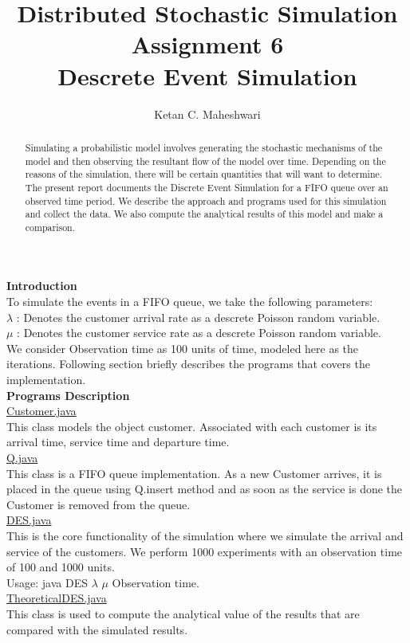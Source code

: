 \documentclass[a4paper,10pt]{report}
\title{Distributed Stochastic Simulation\\ Assignment 6\\ Descrete Event Simulation}
\author{Ketan C. Maheshwari}
\begin{document}
\maketitle

\begin{abstract}
Simulating a probabilistic model involves generating the stochastic mechanisms of the model and then observing the resultant flow of the model over time. Depending on the reasons of the simulation, there will be certain quantities that will want to determine. The present report documents the Discrete Event Simulation for a FIFO queue over an observed time period. We describe the approach and programs used for this simulation and collect the data. We also compute the analytical results of this model and make a comparison.
\end{abstract}

\noindent \textbf{Introduction}\\
To simulate the events in a FIFO queue, we take the following parameters:\\
$\lambda$ : Denotes the customer arrival rate as a descrete Poisson random variable.\\
$\mu$ : Denotes the customer service rate as a descrete Poisson random variable.\\
We consider Observation time as 100 units of time, modeled here as the iterations.
Following section briefly describes the programs that covers the implementation.\\

\noindent \textbf{Programs Description}\\
\underline{Customer.java}\\
This class models the object customer. Associated with each customer is its arrival time, service time and departure time.\\
\underline{Q.java}\\
This class is a FIFO queue implementation. As a new Customer arrives, it is placed in the queue using Q.insert method and as soon as the service is done the Customer is removed from the queue.\\
\underline{DES.java}\\
This is the core functionality of the simulation where we simulate the arrival and service of the customers. We perform 1000 experiments with an observation time of 100 and 1000 units.\\ Usage: java DES $\lambda$ $\mu$ Observation time.\\
\underline{TheoreticalDES.java}\\ 
This class is used to compute the analytical value of the results that are compared with the simulated results.\\[11pt]
\end{document}

